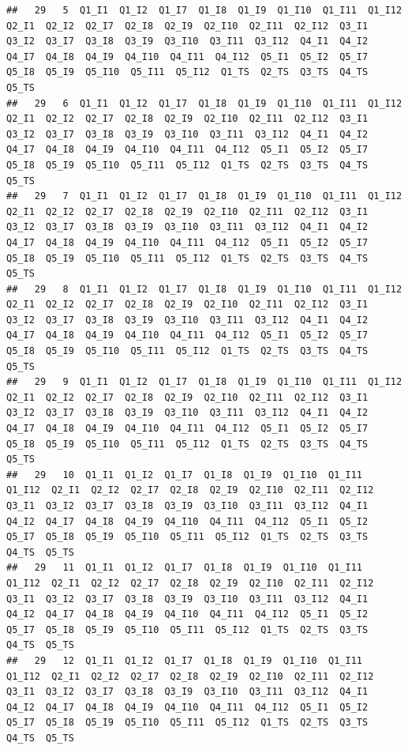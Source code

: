 \documentclass[]{book}
\begin{document}
\begin{verbatim}
##   29   5  Q1_I1  Q1_I2  Q1_I7  Q1_I8  Q1_I9  Q1_I10  Q1_I11  Q1_I12  Q2_I1  Q2_I2  Q2_I7  Q2_I8  Q2_I9  Q2_I10  Q2_I11  Q2_I12  Q3_I1  Q3_I2  Q3_I7  Q3_I8  Q3_I9  Q3_I10  Q3_I11  Q3_I12  Q4_I1  Q4_I2  Q4_I7  Q4_I8  Q4_I9  Q4_I10  Q4_I11  Q4_I12  Q5_I1  Q5_I2  Q5_I7  Q5_I8  Q5_I9  Q5_I10  Q5_I11  Q5_I12  Q1_TS  Q2_TS  Q3_TS  Q4_TS  Q5_TS
##   29   6  Q1_I1  Q1_I2  Q1_I7  Q1_I8  Q1_I9  Q1_I10  Q1_I11  Q1_I12  Q2_I1  Q2_I2  Q2_I7  Q2_I8  Q2_I9  Q2_I10  Q2_I11  Q2_I12  Q3_I1  Q3_I2  Q3_I7  Q3_I8  Q3_I9  Q3_I10  Q3_I11  Q3_I12  Q4_I1  Q4_I2  Q4_I7  Q4_I8  Q4_I9  Q4_I10  Q4_I11  Q4_I12  Q5_I1  Q5_I2  Q5_I7  Q5_I8  Q5_I9  Q5_I10  Q5_I11  Q5_I12  Q1_TS  Q2_TS  Q3_TS  Q4_TS  Q5_TS
##   29   7  Q1_I1  Q1_I2  Q1_I7  Q1_I8  Q1_I9  Q1_I10  Q1_I11  Q1_I12  Q2_I1  Q2_I2  Q2_I7  Q2_I8  Q2_I9  Q2_I10  Q2_I11  Q2_I12  Q3_I1  Q3_I2  Q3_I7  Q3_I8  Q3_I9  Q3_I10  Q3_I11  Q3_I12  Q4_I1  Q4_I2  Q4_I7  Q4_I8  Q4_I9  Q4_I10  Q4_I11  Q4_I12  Q5_I1  Q5_I2  Q5_I7  Q5_I8  Q5_I9  Q5_I10  Q5_I11  Q5_I12  Q1_TS  Q2_TS  Q3_TS  Q4_TS  Q5_TS
##   29   8  Q1_I1  Q1_I2  Q1_I7  Q1_I8  Q1_I9  Q1_I10  Q1_I11  Q1_I12  Q2_I1  Q2_I2  Q2_I7  Q2_I8  Q2_I9  Q2_I10  Q2_I11  Q2_I12  Q3_I1  Q3_I2  Q3_I7  Q3_I8  Q3_I9  Q3_I10  Q3_I11  Q3_I12  Q4_I1  Q4_I2  Q4_I7  Q4_I8  Q4_I9  Q4_I10  Q4_I11  Q4_I12  Q5_I1  Q5_I2  Q5_I7  Q5_I8  Q5_I9  Q5_I10  Q5_I11  Q5_I12  Q1_TS  Q2_TS  Q3_TS  Q4_TS  Q5_TS
##   29   9  Q1_I1  Q1_I2  Q1_I7  Q1_I8  Q1_I9  Q1_I10  Q1_I11  Q1_I12  Q2_I1  Q2_I2  Q2_I7  Q2_I8  Q2_I9  Q2_I10  Q2_I11  Q2_I12  Q3_I1  Q3_I2  Q3_I7  Q3_I8  Q3_I9  Q3_I10  Q3_I11  Q3_I12  Q4_I1  Q4_I2  Q4_I7  Q4_I8  Q4_I9  Q4_I10  Q4_I11  Q4_I12  Q5_I1  Q5_I2  Q5_I7  Q5_I8  Q5_I9  Q5_I10  Q5_I11  Q5_I12  Q1_TS  Q2_TS  Q3_TS  Q4_TS  Q5_TS
##   29   10  Q1_I1  Q1_I2  Q1_I7  Q1_I8  Q1_I9  Q1_I10  Q1_I11  Q1_I12  Q2_I1  Q2_I2  Q2_I7  Q2_I8  Q2_I9  Q2_I10  Q2_I11  Q2_I12  Q3_I1  Q3_I2  Q3_I7  Q3_I8  Q3_I9  Q3_I10  Q3_I11  Q3_I12  Q4_I1  Q4_I2  Q4_I7  Q4_I8  Q4_I9  Q4_I10  Q4_I11  Q4_I12  Q5_I1  Q5_I2  Q5_I7  Q5_I8  Q5_I9  Q5_I10  Q5_I11  Q5_I12  Q1_TS  Q2_TS  Q3_TS  Q4_TS  Q5_TS
##   29   11  Q1_I1  Q1_I2  Q1_I7  Q1_I8  Q1_I9  Q1_I10  Q1_I11  Q1_I12  Q2_I1  Q2_I2  Q2_I7  Q2_I8  Q2_I9  Q2_I10  Q2_I11  Q2_I12  Q3_I1  Q3_I2  Q3_I7  Q3_I8  Q3_I9  Q3_I10  Q3_I11  Q3_I12  Q4_I1  Q4_I2  Q4_I7  Q4_I8  Q4_I9  Q4_I10  Q4_I11  Q4_I12  Q5_I1  Q5_I2  Q5_I7  Q5_I8  Q5_I9  Q5_I10  Q5_I11  Q5_I12  Q1_TS  Q2_TS  Q3_TS  Q4_TS  Q5_TS
##   29   12  Q1_I1  Q1_I2  Q1_I7  Q1_I8  Q1_I9  Q1_I10  Q1_I11  Q1_I12  Q2_I1  Q2_I2  Q2_I7  Q2_I8  Q2_I9  Q2_I10  Q2_I11  Q2_I12  Q3_I1  Q3_I2  Q3_I7  Q3_I8  Q3_I9  Q3_I10  Q3_I11  Q3_I12  Q4_I1  Q4_I2  Q4_I7  Q4_I8  Q4_I9  Q4_I10  Q4_I11  Q4_I12  Q5_I1  Q5_I2  Q5_I7  Q5_I8  Q5_I9  Q5_I10  Q5_I11  Q5_I12  Q1_TS  Q2_TS  Q3_TS  Q4_TS  Q5_TS

\end{verbatim}
\end{document}
